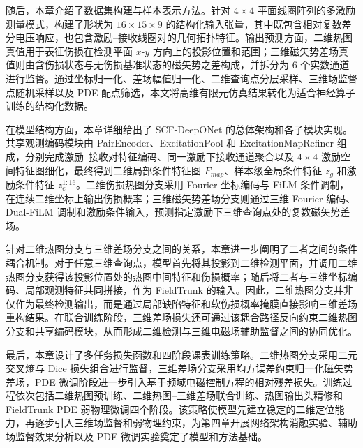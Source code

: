 随后，本章介绍了数据集构建与样本表示方法。针对 $4\times4$ 平面线圈阵列的多激励测量模式，构建了形状为 $16\times15\times9$ 的结构化输入张量，其中既包含相对复数差分电压响应，也包含激励--接收线圈对的几何拓扑特征。输出预测方面，二维热图真值用于表征伤损在检测平面 $x$-$y$ 方向上的投影位置和范围；三维磁矢势差场真值则由含伤损状态与无伤损基准状态的磁矢势之差构成，并拆分为 6 个实数通道进行监督。通过坐标归一化、差场幅值归一化、二维查询点分层采样、三维场监督点随机采样以及 PDE 配点筛选，本文将高维有限元仿真结果转化为适合神经算子训练的结构化数据。

在模型结构方面，本章详细给出了 SCF-DeepONet 的总体架构和各子模块实现。共享观测编码模块由 PairEncoder、ExcitationPool 和 ExcitationMapRefiner 组成，分别完成激励--接收对特征编码、同一激励下接收通道聚合以及 $4\times4$ 激励空间特征图细化，最终得到二维局部条件特征图 $F_{map}$、样本级全局条件特征 $z_g$ 和激励条件特征 $z_e^{1:16}$。二维伤损热图分支采用 Fourier 坐标编码与 FiLM 条件调制，在连续二维坐标上输出伤损概率；三维磁矢势差场分支则通过三维 Fourier 编码、Dual-FiLM 调制和激励条件输入，预测指定激励下三维查询点处的复数磁矢势差场。

针对二维热图分支与三维差场分支之间的关系，本章进一步阐明了二者之间的条件耦合机制。对于任意三维查询点，模型首先将其投影到二维检测平面，并调用二维热图分支获得该投影位置处的热图中间特征和伤损概率；随后将二者与三维坐标编码、局部观测特征共同拼接，作为 FieldTrunk 的输入。因此，二维热图分支并非仅作为最终检测输出，而是通过局部缺陷特征和软伤损概率掩膜直接影响三维差场重构结果。在联合训练阶段，三维差场损失还可通过该耦合路径反向约束二维热图分支和共享编码模块，从而形成二维检测与三维电磁场辅助监督之间的协同优化。

最后，本章设计了多任务损失函数和四阶段课表训练策略。二维热图分支采用二元交叉熵与 Dice 损失组合进行监督，三维差场分支采用均方误差约束归一化磁矢势差场，PDE 微调阶段进一步引入基于频域电磁控制方程的相对残差损失。训练过程依次包括二维热图预训练、二维热图--三维差场联合训练、热图输出头精修和 FieldTrunk PDE 弱物理微调四个阶段。该策略使模型先建立稳定的二维定位能力，再逐步引入三维场监督和弱物理约束，为第四章开展网络架构消融实验、辅助场监督效果分析以及 PDE 微调实验奠定了模型和方法基础。
